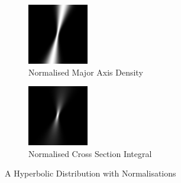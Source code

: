 \documentclass{article}
\begin{document}
\begin{figure}
\begin{subfigure}{.33\textwidth}
          \includegraphics[width=.9\linewidth]{images/GaussianRay3.png}
          \caption{Normalised Major Axis Density}
          \label{fig:hyperbolicsub2}
        \end{subfigure}
        \begin{subfigure}{.33\textwidth}
          \centering
          \includegraphics[width=.9\linewidth]{images/GaussianRay2.png}
          \caption{Normalised Cross Section Integral}
          \label{fig:hyperbolicsub3}
        \end{subfigure}
        \caption{A Hyperbolic Distribution with Normalisations}
        \label{fig:hyperbolic}
        \end{figure}
\end{document}
